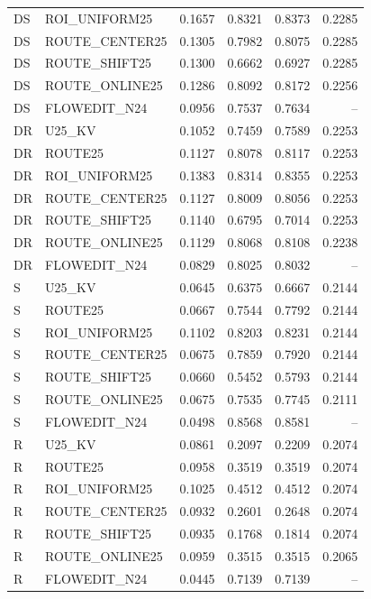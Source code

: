 \begin{longtable}{lp{.30\linewidth}rrrr}
DS & ROI\_UNIFORM25 & 0.1657 & 0.8321 & 0.8373 & 0.2285 \\
DS & ROUTE\_CENTER25 & 0.1305 & 0.7982 & 0.8075 & 0.2285 \\
DS & ROUTE\_SHIFT25 & 0.1300 & 0.6662 & 0.6927 & 0.2285 \\
DS & ROUTE\_ONLINE25 & 0.1286 & 0.8092 & 0.8172 & 0.2256 \\
DS & FLOWEDIT\_N24 & 0.0956 & 0.7537 & 0.7634 & -- \\
DR & U25\_KV & 0.1052 & 0.7459 & 0.7589 & 0.2253 \\
DR & ROUTE25 & 0.1127 & 0.8078 & 0.8117 & 0.2253 \\
DR & ROI\_UNIFORM25 & 0.1383 & 0.8314 & 0.8355 & 0.2253 \\
DR & ROUTE\_CENTER25 & 0.1127 & 0.8009 & 0.8056 & 0.2253 \\
DR & ROUTE\_SHIFT25 & 0.1140 & 0.6795 & 0.7014 & 0.2253 \\
DR & ROUTE\_ONLINE25 & 0.1129 & 0.8068 & 0.8108 & 0.2238 \\
DR & FLOWEDIT\_N24 & 0.0829 & 0.8025 & 0.8032 & -- \\
S & U25\_KV & 0.0645 & 0.6375 & 0.6667 & 0.2144 \\
S & ROUTE25 & 0.0667 & 0.7544 & 0.7792 & 0.2144 \\
S & ROI\_UNIFORM25 & 0.1102 & 0.8203 & 0.8231 & 0.2144 \\
S & ROUTE\_CENTER25 & 0.0675 & 0.7859 & 0.7920 & 0.2144 \\
S & ROUTE\_SHIFT25 & 0.0660 & 0.5452 & 0.5793 & 0.2144 \\
S & ROUTE\_ONLINE25 & 0.0675 & 0.7535 & 0.7745 & 0.2111 \\
S & FLOWEDIT\_N24 & 0.0498 & 0.8568 & 0.8581 & -- \\
R & U25\_KV & 0.0861 & 0.2097 & 0.2209 & 0.2074 \\
R & ROUTE25 & 0.0958 & 0.3519 & 0.3519 & 0.2074 \\
R & ROI\_UNIFORM25 & 0.1025 & 0.4512 & 0.4512 & 0.2074 \\
R & ROUTE\_CENTER25 & 0.0932 & 0.2601 & 0.2648 & 0.2074 \\
R & ROUTE\_SHIFT25 & 0.0935 & 0.1768 & 0.1814 & 0.2074 \\
R & ROUTE\_ONLINE25 & 0.0959 & 0.3515 & 0.3515 & 0.2065 \\
R & FLOWEDIT\_N24 & 0.0445 & 0.7139 & 0.7139 & -- \\
\hline\end{longtable}
\endgroup


